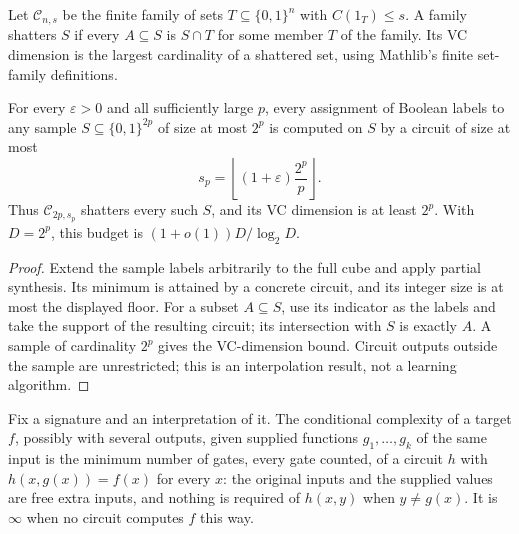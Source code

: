 \begin{definition}
  \label{def:lowerbounds-circuit-supports}
  \leanok
  Let $\mathcal C_{n,s}$ be the finite family of sets
  $T\subseteq\{0,1\}^n$ with $C(1_T)\le s$.
  A family shatters $S$ if every $A\subseteq S$ is $S\cap T$ for some
  member $T$ of the family. Its VC dimension is the largest cardinality
  of a shattered set, using Mathlib's finite set-family definitions.
\end{definition}

\begin{theorem}
  \label{thm:lowerbounds-circuit-shattering}
  \leanok
  For every $\varepsilon>0$ and all sufficiently large $p$, every assignment
  of Boolean labels to any sample $S\subseteq\{0,1\}^{2p}$ of size at most
  $2^p$ is computed on $S$ by a circuit of size at most
  \[
    s_p=\left\lfloor(1+\varepsilon)\frac{2^p}{p}\right\rfloor.
  \]
  Thus $\mathcal C_{2p,s_p}$ shatters every such $S$, and its VC dimension
  is at least $2^p$. With $D=2^p$, this budget is
  $(1+o(1))D/\log_2 D$.
\end{theorem}
\begin{proof}
  \leanok
  Extend the sample labels arbitrarily to the full cube and apply partial
  synthesis. Its minimum is attained by a concrete circuit, and its integer
  size is at most the displayed floor. For a subset $A\subseteq S$, use
  its indicator as the labels and take the support of the resulting circuit;
  its intersection with $S$ is exactly $A$. A sample of cardinality $2^p$
  gives the VC-dimension bound. Circuit outputs outside the sample are
  unrestricted; this is an interpolation result, not a learning algorithm.
\end{proof}

\begin{definition}
  \label{def:lowerbounds-algebraic-conditional}
  \leanok
  Fix a signature and an interpretation of it. The conditional complexity of a
  target $f$, possibly with several outputs, given supplied functions
  $g_1, \ldots, g_k$ of the same input is the minimum number of gates, every
  gate counted, of a circuit $h$ with $h(x, g(x)) = f(x)$ for every $x$: the
  original inputs and the supplied values are free extra inputs, and nothing is
  required of $h(x, y)$ when $y \ne g(x)$. It is $\infty$ when no circuit
  computes $f$ this way.
\end{definition}

